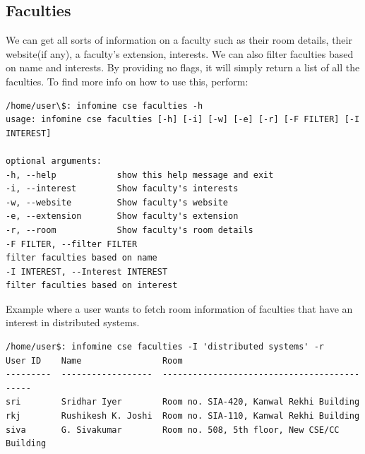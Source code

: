 \documentclass[12pt, letterpaper, twoside]{article}
\begin{document}
\subsection{Faculties}
We can get all sorts of information on a faculty such as their room details, their website(if any),
a faculty's extension, interests. We can also filter faculties based on name
and interests. By providing no flags, it will simply return a list of all the faculties.
To find more info on how to use this, perform:
\begin{verbatim}
/home/user\$: infomine cse faculties -h
usage: infomine cse faculties [-h] [-i] [-w] [-e] [-r] [-F FILTER] [-I INTEREST]

optional arguments:
-h, --help            show this help message and exit
-i, --interest        Show faculty's interests
-w, --website         Show faculty's website
-e, --extension       Show faculty's extension
-r, --room            Show faculty's room details
-F FILTER, --filter FILTER
filter faculties based on name
-I INTEREST, --Interest INTEREST
filter faculties based on interest
\end{verbatim}
Example where a user wants to fetch room information of faculties that 
have an interest in distributed systems. 
\begin{verbatim}
/home/user$: infomine cse faculties -I 'distributed systems' -r
User ID    Name                Room                                          
---------  ------------------  --------------------------------------------  
sri        Sridhar Iyer        Room no. SIA-420, Kanwal Rekhi Building       
rkj        Rushikesh K. Joshi  Room no. SIA-110, Kanwal Rekhi Building 
siva       G. Sivakumar        Room no. 508, 5th floor, New CSE/CC Building 
\end{verbatim}
\end{document}
